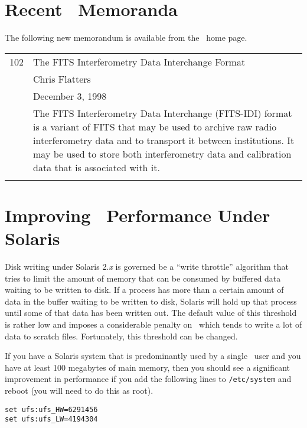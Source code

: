 \section{Recent \AIPS\ Memoranda}

The following new memorandum is available from the \AIPS\ home page.

\begin{tabular}{lp{6in}}
102 &   The FITS Interferometry Data Interchange Format\\
   &    Chris Flatters\\
   &    December 3, 1998\\
   &    The FITS Interferometry Data Interchange (FITS-IDI) format is
        a variant of FITS that may be used to archive raw radio
        interferometry data and to transport it between institutions.
        It may be used to store both interferometry data and
        calibration data that is associated with it.\\
   &    \\
\end{tabular}
\vfill\eject

\section{Improving \AIPS\ Performance Under Solaris}

Disk writing under Solaris 2.{\it x} is governed be a ``write
throttle'' algorithm that tries to limit the amount of memory that can
be consumed by buffered data waiting to be written to disk. If a
process has more than a certain amount of data in the buffer waiting
to be written to disk, Solaris will hold up that process until some of
that data has been written out.  The default value of this threshold is
rather low and imposes a considerable penalty on \AIPS\ which tends to
write a lot of data to scratch files.  Fortunately, this threshold can
be changed.

If you have a Solaris system that is predominantly used by a single
\AIPS\ user and you have at least 100 megabytes of main memory, then
you should see a significant improvement in performance if you add the
following lines to {\tt /etc/system} and reboot (you will need to do
this as root).
\begin{center}
{\tt set ufs:ufs\_HW=6291456} \\
{\tt set ufs:ufs\_LW=4194304} \\
\end{center}

